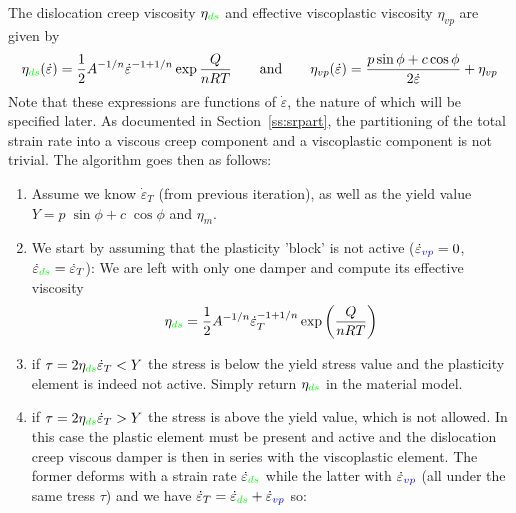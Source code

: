 The dislocation creep viscosity $\eta_{\color{green}ds}$ and effective viscoplastic viscosity $\eta_{vp}$ are given by 
\[
\eta_{\color{green}ds}(\dot\varepsilon) = \frac{1}{2} A^{-1/n} \dot{\varepsilon}^{-1+1/n} \exp \frac{Q}{nRT}
\qquad
\text{and}
\qquad
\eta_{vp}(\dot\varepsilon) = \frac{p \sin \phi + c \cos \phi}{2 \dot{\varepsilon}}  + \eta_{vp}
\]
Note that these expressions are functions of $\dot\varepsilon$, the nature of which will be specified later. 
As documented in Section~\ref{ss:srpart}, 
the partitioning of the total strain rate into a viscous creep component and a viscoplastic component 
is not trivial.  
The algorithm goes then as follows:
\begin{enumerate}
\item Assume we know $\dot\varepsilon_T$ (from previous iteration), 
as well as the yield value  $Y = p\; \sin\phi + c \; \cos \phi$ and $\eta_m$.
\item We start by assuming that the plasticity 'block' is not active 
($\dot{\varepsilon}_{\color{blue}vp}=0$, $\dot{\varepsilon}_{\color{green}ds}=\dot{\varepsilon}_T$): 
We are left with only one damper and compute its effective viscosity
\[
\eta_{\color{green}ds} = \frac{1}{2} A^{-1/n} \dot{\varepsilon}_T^{-1+1/n} \exp \left( \frac{Q}{nRT} \right)
\] 

\item if $\tau =2 {\eta}_{\color{green}ds} \dot\varepsilon_T < Y$ the stress is below the yield stress value 
and the plasticity element is indeed not active. Simply return ${\eta}_{\color{green}ds}$ in the material model.

\item if $\tau=2 \eta_{\color{green}ds} \dot\varepsilon_T > Y$ the stress is above the 
yield value, which is not allowed. In this case the plastic element must be present 
and active and the dislocation creep viscous damper is then 
in series with the viscoplastic element. The former deforms 
with a strain rate $\dot{\varepsilon}_{\color{green}ds}$ while the latter 
with $\dot\varepsilon_{\color{blue}vp}$ (all under the same tress $\tau$) 
and we have  $\dot\varepsilon_T = \dot{\varepsilon}_{\color{green}ds} + \dot\varepsilon_{\color{blue}vp}$ so:


\end{enumerate}
